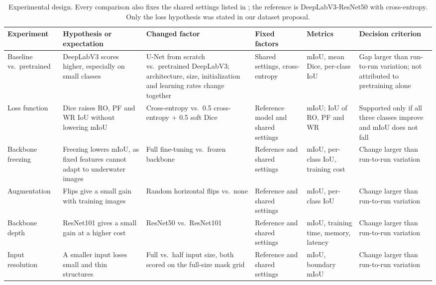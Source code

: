 \begin{table}[htbp]
\centering\footnotesize
\setlength{\tabcolsep}{3pt}
\renewcommand{\arraystretch}{1.25}
\caption{Experimental design. Every comparison also fixes the shared settings
listed in ; the reference is DeepLabV3-ResNet50 with
cross-entropy. Only the loss hypothesis was stated in our dataset proposal.}
\label{tab:experiment-design}
\begin{tabularx}{\linewidth}{>{\raggedright\arraybackslash}p{2.05cm}YYYYY}
\toprule
Experiment & Hypothesis or expectation & Changed factor & Fixed factors & Metrics & Decision criterion\\
\midrule
Baseline vs.\ pretrained & DeepLabV3 scores higher, especially on small classes
  & U-Net from scratch vs.\ pretrained DeepLabV3; architecture, size,
    initialization and learning rates change together
  & Shared settings, cross-entropy
  & mIoU, mean Dice, per-class IoU
  & Gap larger than run-to-run variation; not attributed to pretraining alone\\
Loss function & Dice raises RO, PF and WR IoU without lowering mIoU
  & Cross-entropy vs.\ 0.5 cross-entropy + 0.5 soft Dice
  & Reference model and shared settings
  & mIoU; IoU of RO, PF and WR
  & Supported only if all three classes improve and mIoU does not fall\\
Backbone freezing & Freezing lowers mIoU, as fixed features cannot adapt to
    underwater images
  & Full fine-tuning vs.\ frozen backbone
  & Reference and shared settings
  & mIoU, per-class IoU, training cost
  & Change larger than run-to-run variation\\
Augmentation & Flips give a small gain with \suimTrainImages{} training images
  & Random horizontal flips vs.\ none
  & Reference and shared settings
  & mIoU, per-class IoU
  & Change larger than run-to-run variation\\
Backbone depth & ResNet101 gives a small gain at a higher cost
  & ResNet50 vs.\ ResNet101
  & Reference and shared settings
  & mIoU, training time, memory, latency
  & Change larger than run-to-run variation\\
Input resolution & A smaller input loses small and thin structures
  & Full vs.\ half input size, both scored on the full-size mask grid
  & Reference and shared settings
  & mIoU, boundary mIoU
  & Change larger than run-to-run variation\\
\bottomrule
\end{tabularx}
\end{table}
